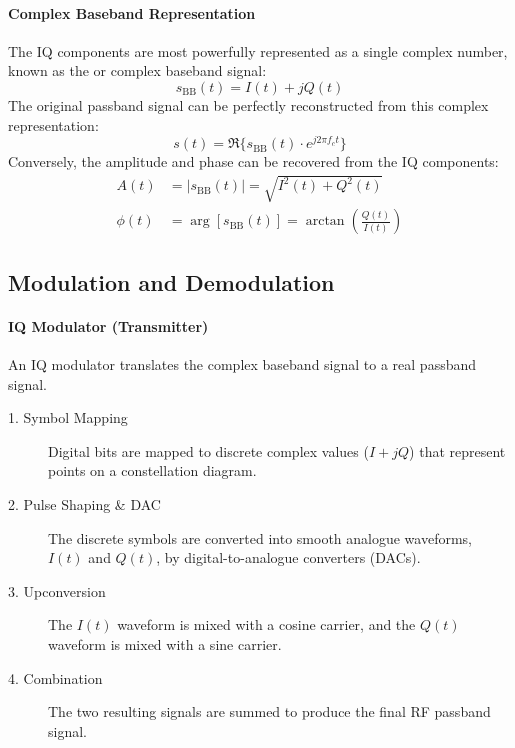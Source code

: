 \paragraph{Complex Baseband Representation}
The IQ components are most powerfully represented as a single complex number, known as the  or complex baseband signal:
\begin{equation}
    s_{\text{BB}}(t) = I(t) + jQ(t)
\end{equation}
The original passband signal can be perfectly reconstructed from this complex representation:
\begin{equation}
    s(t) = \Re\{s_{\text{BB}}(t) \cdot e^{j2\pi f_c t}\}
\end{equation}
Conversely, the amplitude and phase can be recovered from the IQ components:
\begin{align}
    A(t) &= |s_{\text{BB}}(t)| = \sqrt{I^2(t) + Q^2(t)} \\
    \phi(t) &= \arg[s_{\text{BB}}(t)] = \arctan\left(\frac{Q(t)}{I(t)}\right)
\end{align}

\subsection{Modulation and Demodulation}

\paragraph{IQ Modulator (Transmitter)}
An IQ modulator translates the complex baseband signal to a real passband signal.
\begin{description}
    \item[1. Symbol Mapping] Digital bits are mapped to discrete complex values ($I+jQ$) that represent points on a constellation diagram.
    \item[2. Pulse Shaping & DAC] The discrete symbols are converted into smooth analogue waveforms, $I(t)$ and $Q(t)$, by digital-to-analogue converters (DACs).
    \item[3. Upconversion] The $I(t)$ waveform is mixed with a cosine carrier, and the $Q(t)$ waveform is mixed with a sine carrier.
    \item[4. Combination] The two resulting signals are summed to produce the final RF passband signal.
\end{description}

